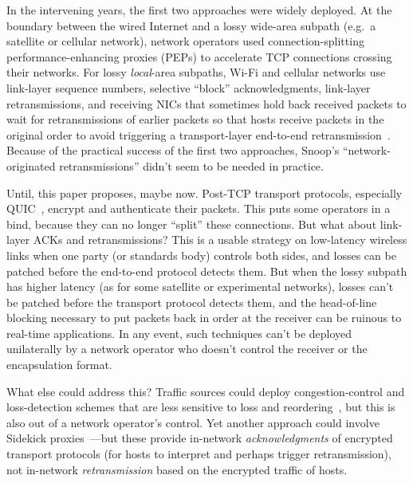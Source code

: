 In the intervening years, the first two approaches were widely
deployed. At the boundary between the wired Internet and a lossy
wide-area subpath (e.g.~a satellite or cellular network), network
operators used connection-splitting performance-enhancing proxies
(PEPs) to accelerate TCP connections crossing their networks. For
lossy \emph{local}-area subpaths, Wi-Fi and cellular networks use
link-layer sequence numbers, selective ``block'' acknowledgments,
link-layer retransmissions, and receiving NICs that sometimes hold
back received packets to wait for retransmissions of earlier packets
so that hosts receive packets in the original order to avoid
triggering a transport-layer end-to-end retransmission~\cite{rfc3366,
  rfc8985, 802.1ac, 5Greorder}. Because of the practical success of
the first two approaches, Snoop's ``network-originated
retransmissions'' didn't seem to be needed in practice.

Until, this paper proposes, maybe now. Post-TCP transport protocols,
especially QUIC~\cite{rfc9000}, encrypt and authenticate their
packets. This puts some operators in a bind, because they can no longer
``split'' these connections.
But what about link-layer ACKs and retransmissions?
This is a usable strategy on low-latency wireless links when one party
(or standards body) controls both sides, and losses can be patched
before the end-to-end protocol detects them. But when the lossy
subpath has higher latency (as for some satellite or experimental
networks), losses can't be patched before the transport protocol
detects them, and the head-of-line blocking necessary to put
packets back in order at the receiver can be ruinous to real-time
applications. In any event, such techniques can't be deployed
unilaterally by a network operator who doesn't control the receiver or
the encapsulation format.

What else could address this? Traffic sources could deploy
congestion-control and loss-detection schemes that are less sensitive
to loss and reordering~\cite{rfc8985}, but this is also out of a
network operator's control. Yet another approach could involve
Sidekick proxies~\cite{yuan2024sidekick}---but these provide
in-network \emph{acknowledgments} of encrypted transport protocols
(for hosts to interpret and perhaps trigger retransmission), not
in-network \emph{retransmission} based on the encrypted traffic of
hosts.

